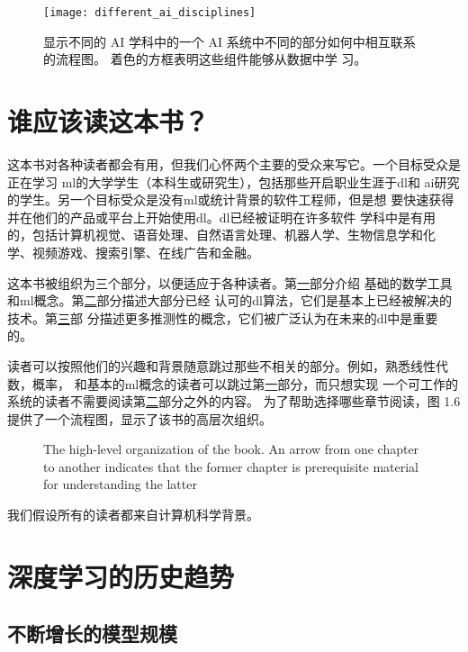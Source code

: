 \begin{figure}[h]
  \centering
  \texttt{[image: different\_ai\_disciplines]}
  \caption{显示不同的 AI 学科中的一个 AI 系统中不同的部分如何中相互联系的流程图。
    着色的方框表明这些组件能够从数据中学
    习。\label{fig:different_ai_disciplines}}
\end{figure}

\section{谁应该读这本书？}
\label{sec:who_should_read_this_book}

这本书对各种读者都会有用，但我们心怀两个主要的受众来写它。一个目标受众是正在学习
\gls*{ml}的大学学生（本科生或研究生），包括那些开启职业生涯于\gls*{dl}和
\gls*{ai}研究的学生。另一个目标受众是没有\gls*{ml}或统计背景的软件工程师，但是想
要快速获得并在他们的产品或平台上开始使用\gls*{dl}。\gls*{dl}已经被证明在许多软件
学科中是有用的，包括计算机视觉、语音处理、自然语言处理、机器人学、生物信息学和化
学、视频游戏、搜索引擎、在线广告和金融。

这本书被组织为三个部分，以便适应于各种读者。第\hyperref[part_basics]{一}部分介绍
基础的数学工具和\gls*{ml}概念。第\hyperref[part_practical]{二}部分描述大部分已经
认可的\gls*{dl}算法，它们是基本上已经被解决的技术。第\hyperref[part_research]{三}部
分描述更多推测性的概念，它们被广泛认为在未来的\gls*{dl}中是重要的。

读者可以按照他们的兴趣和背景随意跳过那些不相关的部分。例如，熟悉线性代数，概率，
和基本的\gls*{ml}概念的读者可以跳过第\hyperref[part_basics]{一}部分，而只想实现
一个可工作的系统的读者不需要阅读第\hyperref[part_practical]{二}部分之外的内容。
为了帮助选择哪些章节阅读，图 1.6 提供了一个流程图，显示了该书的高层次组织。

\begin{figure}[h]
  \centering
  \caption{The high-level organization of the book. An arrow from one chapter to
    another indicates that the former chapter is prerequisite material for
    understanding the latter\label{book_organization}}
\end{figure}

我们假设所有的读者都来自计算机科学背景。

\section{深度学习的历史趋势}



\subsection{不断增长的模型规模}
\label{subsec:increasing_model_sizes}
